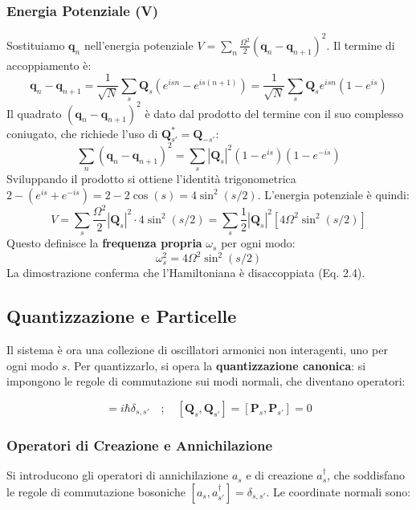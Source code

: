 \subsubsection{Energia Potenziale (V)}
Sostituiamo $\mathbf{q}_n$ nell'energia potenziale $V = \sum_{n} \frac{\Omega^2}{2}(\mathbf{q}_n - \mathbf{q}_{n+1})^2$. Il termine di accoppiamento è:
$$
\mathbf{q}_n - \mathbf{q}_{n+1} = \frac{1}{\sqrt{N}} \sum_{s} \mathbf{Q}_s (e^{is n} - e^{is (n+1)}) = \frac{1}{\sqrt{N}} \sum_{s} \mathbf{Q}_s e^{is n} (1 - e^{is})
$$
Il quadrato $(\mathbf{q}_n - \mathbf{q}_{n+1})^2$ è dato dal prodotto del termine con il suo complesso coniugato, che richiede l'uso di $\mathbf{Q}_{s'}^{*} = \mathbf{Q}_{-s'}$:
$$
\sum_{n} (\mathbf{q}_n - \mathbf{q}_{n+1})^2 = \sum_{s} |\mathbf{Q}_s|^2 (1 - e^{is})(1 - e^{-is})
$$
Sviluppando il prodotto si ottiene l'identità trigonometrica $2 - (e^{is} + e^{-is}) = 2 - 2 \cos(s) = 4 \sin^2(s/2)$.
L'energia potenziale è quindi:
$$
V = \sum_{s} \frac{\Omega^2}{2} |\mathbf{Q}_s|^2 \cdot 4 \sin^2(s/2) = \sum_{s} \frac{1}{2} |\mathbf{Q}_s|^2 \left[ 4\Omega^2 \sin^2(s/2) \right]
$$
Questo definisce la \textbf{frequenza propria} $\omega_s$ per ogni modo:
\begin{equation}
\omega_s^2 = 4\Omega^2 \sin^2(s/2)
\end{equation}
La dimostrazione conferma che l'Hamiltoniana è disaccoppiata (Eq. 2.4).

\subsection{Quantizzazione e Particelle}

Il sistema è ora una collezione di oscillatori armonici non interagenti, uno per ogni modo $s$. Per quantizzarlo, si opera la \textbf{quantizzazione canonica}: si impongono le regole di commutazione sui modi normali, che diventano operatori:

\begin{equation}
[\mathbf{Q}_s, \mathbf{P}_{s'}^{\dagger}] = i\hbar\delta_{s,s'} \quad ; \quad [\mathbf{Q}_s, \mathbf{Q}_{s'}] = [\mathbf{P}_s, \mathbf{P}_{s'}] = 0
\end{equation}

\subsubsection{Operatori di Creazione e Annichilazione}

Si introducono gli operatori di annichilazione $a_s$ e di creazione $a_s^\dagger$, che soddisfano le regole di commutazione bosoniche $[a_s, a_{s'}^{\dagger}] = \delta_{s,s'}$. Le coordinate normali sono:

